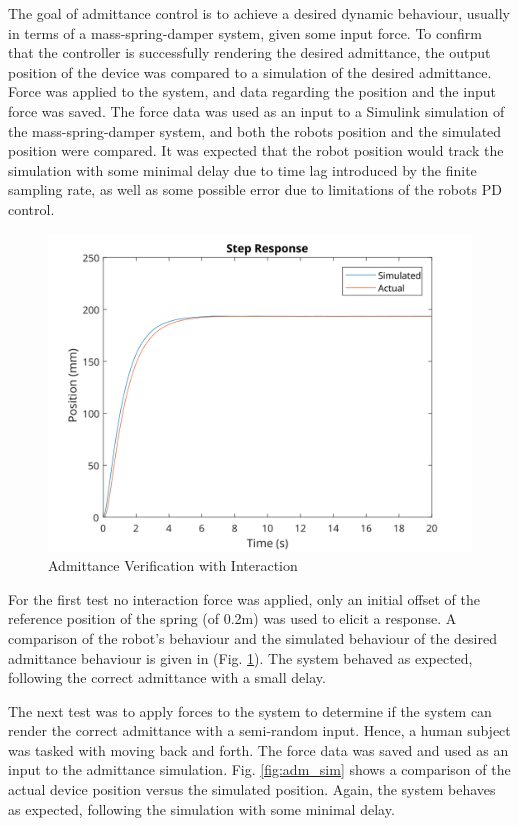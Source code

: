 \documentclass[12pt]{report}
\begin{document}
	The goal of admittance control is to achieve a desired dynamic behaviour, usually in terms of a mass-spring-damper system, given some input force. To confirm that the controller is successfully rendering the desired admittance, the output position of the device was compared to a simulation of the desired admittance. Force was applied to the system, and data regarding the position and the input force was saved. The force data was used as an input to a Simulink simulation of the mass-spring-damper system, and both the robots position and the simulated position were compared. It was expected that the robot position would track the simulation with some minimal delay due to time lag introduced by the finite sampling rate, as well as some possible error due to limitations of the robots PD control. 		

	
\begin{figure}[t] 
	\centering
	\includegraphics[width=0.9\linewidth]{Mar12_NoForce_Step_Plot}
	\caption{Admittance Verification with Interaction}
	\label{fig:nVerNoInt}
\end{figure}
	
For the first test no interaction force was applied, only an initial offset of the reference position of the spring (of 0.2m) was used to elicit a response. A comparison of the robot's behaviour and the simulated behaviour of the desired admittance behaviour is given in (Fig. \ref{fig:nVerNoInt}). The system behaved as expected, following the correct admittance with a small delay.

The next test was to apply forces to the system to determine if the system can render the correct admittance with a semi-random input. Hence, a human subject was tasked with moving back and forth. The force data was saved and used as an input to the admittance simulation. Fig. \ref{fig:adm_sim} shows a comparison of the actual device position versus the simulated position. Again, the system behaves as expected, following the simulation with some minimal delay.
\end{document}
